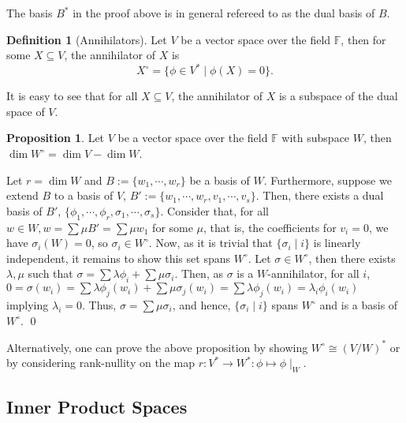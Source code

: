 \documentclass[
]{article}
\theoremstyle{definition}
\newtheorem{prop}{Proposition}[section]
\theoremstyle{definition}
\newtheorem{definition}{Definition}[section]
\begin{document}
The basis \(B^*\) in the proof above is in general refereed to as the
dual basis of \(B\).

\begin{definition}[Annihilators]
  Let \(V\) be a vector space over the field \(\mathbb{F}\), then for some 
  \(X \subseteq V\), the annihilator of \(X\) is 
  \[X^\circ = \{\phi \in V^* \mid \phi(X) = 0\}.\]
\end{definition}

It is easy to see that for all \(X \subseteq V\), the annihilator of
\(X\) is a subspace of the dual space of \(V\).

\begin{prop}
  Let \(V\) be a vector space over the field \(\mathbb{F}\) with subspace \(W\),
  then \(\dim W^\circ = \dim V - \dim W\).
\end{prop}
\proof

Let \(r = \dim W\) and \(B := \{w_1, \cdots, w_r\}\) be a basis of
\(W\). Furthermore, suppose we extend \(B\) to a basis of \(V\),
\(B' := \{w_1, \cdots, w_r, v_1, \cdots, v_s\}\). Then, there exists a
dual basis of \(B'\),
\(\{\phi_1, \cdots, \phi_r, \sigma_1, \cdots, \sigma_s\}\). Consider
that, for all \(w \in W, w = \sum \mu B' = \sum \mu w_1\) for some
\(\mu\), that is, the coefficients for \(v_i = 0\), we have
\(\sigma_i(W) = 0\), so \(\sigma_i \in W^\circ\). Now, as it is trivial
that \(\{\sigma_i \mid i\}\) is linearly independent, it remains to show
this set spans \(W^\circ\). Let \(\sigma \in W^\circ\), then there
exists \(\lambda, \mu\) such that
\(\sigma = \sum \lambda \phi_i + \sum \mu \sigma_i\). Then, as
\(\sigma\) is a \(W\)-annihilator, for all \(i\),
\(0 = \sigma(w_i) =  \sum \lambda \phi_j(w_i) + \sum \mu \sigma_j(w_i) = \sum \lambda \phi_j(w_i)  = \lambda_i \phi_i(w_i)\)
implying \(\lambda_i = 0\). Thus, \(\sigma = \sum \mu \sigma_i\), and
hence, \(\{\sigma_i \mid i\}\) spans \(W^\circ\) and is a basis of
\(W^\circ\). \qed

Alternatively, one can prove the above proposition by showing
\(W^\circ \cong (V / W)^*\) or by considering rank-nullity on the map
\(r : V^* \to W^* : \phi \mapsto \phi\mid_W\).

\hypertarget{inner-product-spaces}{%
\subsection{Inner Product Spaces}\label{inner-product-spaces}}
\end{document}
